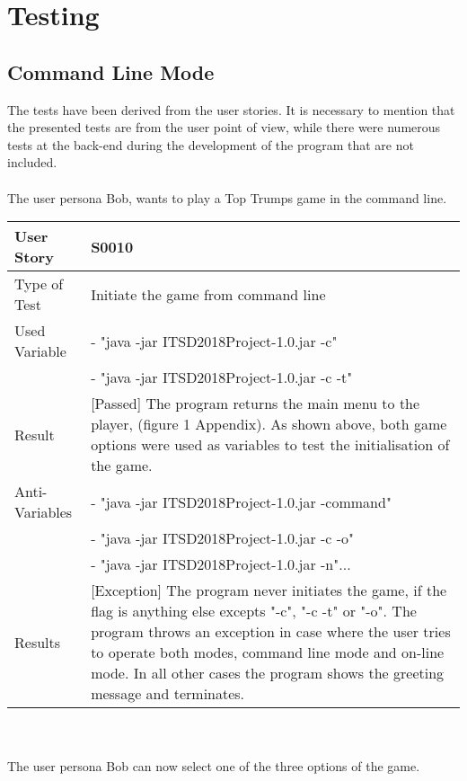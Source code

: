 \newpage
\section{Testing}
\subsection{Command Line Mode}
The tests have been derived from the user stories. It is necessary to mention that the presented tests are from the user point of view, while there were numerous tests at the back-end during the development of the program that are not included. \\
\vspace{0.1cm}\\
The user persona Bob, wants to play a Top Trumps game in the command line.    
\vspace{0.2cm}\\
\begin{tabular}{l | p{12cm}}
User Story & \textbf{S0010} \\
\hline
Type of Test & Initiate the game from command line\\
\hline
Used Variable & 
 - "java -jar ITSD2018Project-1.0.jar -c" \\
 & 
 - "java -jar ITSD2018Project-1.0.jar -c -t"
\\
\hline
Result & [Passed] The program returns the main menu to the player, (figure 1 Appendix). As shown above, both game options were used as variables to test the initialisation of the game.\\ 
\hline
Anti-Variables & - "java -jar ITSD2018Project-1.0.jar -command"\\
& - "java -jar ITSD2018Project-1.0.jar -c -o"\\
& - "java -jar ITSD2018Project-1.0.jar -n"...\\
\hline
Results & [Exception] The program never initiates the game, if the flag is anything else excepts "-c", "-c -t" or "-o". The program throws an exception in case where the user tries to operate both modes, command line mode and on-line mode. In all other cases the program shows the greeting message and terminates.\\
\hline 
\end{tabular}\\
\vspace{0.2cm}\\ 
The user persona Bob can now select one of the three options of the game.\\
\vspace{0.2cm}\\
